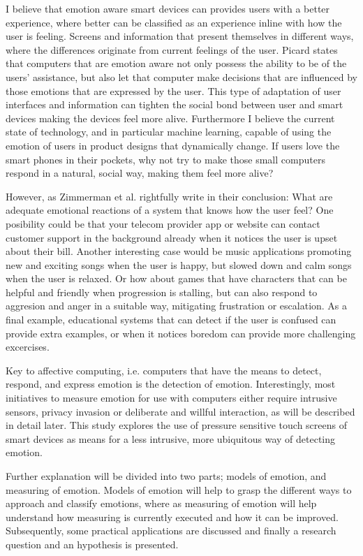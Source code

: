 \documentclass{sigchi}
\begin{document}
I believe that emotion aware smart devices can provides users with a better experience, where better can be classified as an experience inline with how the user is feeling. Screens and information that present themselves in different ways, where the differences originate from current feelings of the user. Picard \cite{Picard1995} states that computers that are emotion aware not only possess the ability to be of the users' assistance, but also let that computer make decisions that are influenced by those emotions that are expressed by the user. This type of adaptation of user interfaces and information can tighten the social bond between user and smart devices making the devices feel more alive. Furthermore I believe the current state of technology, and in particular machine learning, capable of using the emotion of users in product designs that dynamically change. If users love the smart phones in their pockets, why not try to make those small computers respond in a natural, social way, making them feel more alive?

However, as Zimmerman et al. \cite{Zimmermann2003} rightfully write in their conclusion: What are adequate emotional reactions of a system that knows how the user feel? One posibility could be that your telecom provider app or website can contact customer support in the background already when it notices the user is upset about their bill. Another interesting case would be music applications promoting new and exciting songs when the user is happy, but slowed down and calm songs when the user is relaxed. Or how about games that have characters that can be helpful and friendly when progression is stalling, but can also respond to aggresion and anger in a suitable way, mitigating frustration or escalation. As a final example, educational systems that can detect if the user is confused can provide extra examples, or when it notices boredom can provide more challenging excercises.

Key to affective computing, i.e. computers that have the means to detect, respond, and express emotion is the detection of emotion. Interestingly, most initiatives to measure emotion for use with computers either require intrusive sensors, privacy invasion or deliberate and willful interaction, as will be described in detail later. This study explores the use of pressure sensitive touch screens of smart devices as means for a less intrusive, more ubiquitous way of detecting emotion.

Further explanation will be divided into two parts; models of emotion, and measuring of emotion. Models of emotion will help to grasp the different ways to approach and classify emotions, where as measuring of emotion will help understand how measuring is currently executed and how it can be improved. Subsequently, some practical applications are discussed and finally a research question and an hypothesis is presented.
\end{document}

